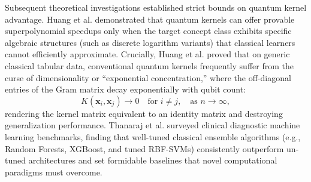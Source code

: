 \documentclass[journal,twocolumn]{IEEEtran}
\begin{document}
Subsequent theoretical investigations established strict bounds on quantum kernel advantage. Huang et al. \cite{huang2021power} demonstrated that quantum kernels can offer provable superpolynomial speedups only when the target concept class exhibits specific algebraic structures (such as discrete logarithm variants) that classical learners cannot efficiently approximate. Crucially, Huang et al. proved that on generic classical tabular data, conventional quantum kernels frequently suffer from the curse of dimensionality or ``exponential concentration,'' where the off-diagonal entries of the Gram matrix decay exponentially with qubit count:
\begin{equation}
K(\mathbf{x}_i, \mathbf{x}_j) \to 0 \quad \text{for } i \neq j, \quad \text{as } n \to \infty,
\end{equation}
rendering the kernel matrix equivalent to an identity matrix and destroying generalization performance. Thanaraj et al. \cite{thanaraj2022comparative} surveyed clinical diagnostic machine learning benchmarks, finding that well-tuned classical ensemble algorithms (e.g., Random Forests, XGBoost, and tuned RBF-SVMs) consistently outperform un-tuned architectures and set formidable baselines that novel computational paradigms must overcome.
\end{document}

